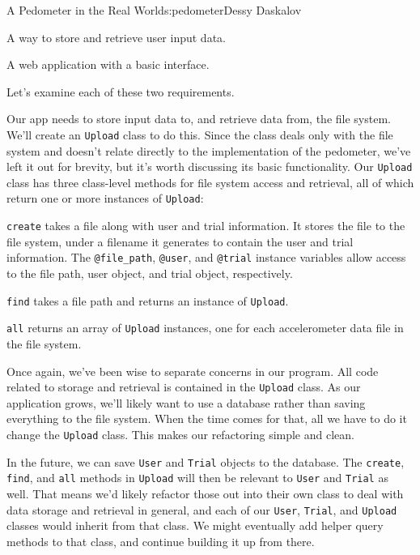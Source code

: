 \begin{aosachapter}{A Pedometer in the Real World}{s:pedometer}{Dessy Daskalov}
\begin{aosaenumerate}
\def\labelenumi{\arabic{enumi}.}

\item
  A way to store and retrieve user input data.
\item
  A web application with a basic interface.
\end{aosaenumerate}

Let's examine each of these two requirements.

\label{storing-and-retrieving-data}

Our app needs to store input data to, and retrieve data from, the file
system. We'll create an \texttt{Upload} class to do this. Since the
class deals only with the file system and doesn't relate directly to the
implementation of the pedometer, we've left it out for brevity, but it's
worth discussing its basic functionality. Our \texttt{Upload} class has
three class-level methods for file system access and retrieval, all of
which return one or more instances of \texttt{Upload}:

\begin{aosaitemize}

\item
  \texttt{create} takes a file along with user and trial information. It
  stores the file to the file system, under a filename it generates to
  contain the user and trial information. The \texttt{@file\_path},
  \texttt{@user}, and \texttt{@trial} instance variables allow access to
  the file path, user object, and trial object, respectively.
\item
  \texttt{find} takes a file path and returns an instance of
  \texttt{Upload}.
\item
  \texttt{all} returns an array of \texttt{Upload} instances, one for
  each accelerometer data file in the file system.
\end{aosaitemize}

\label{separation-of-concerns-in-upload}

Once again, we've been wise to separate concerns in our program. All
code related to storage and retrieval is contained in the
\texttt{Upload} class. As our application grows, we'll likely want to
use a database rather than saving everything to the file system. When
the time comes for that, all we have to do it change the \texttt{Upload}
class. This makes our refactoring simple and clean.

In the future, we can save \texttt{User} and \texttt{Trial} objects to
the database. The \texttt{create}, \texttt{find}, and \texttt{all}
methods in \texttt{Upload} will then be relevant to \texttt{User} and
\texttt{Trial} as well. That means we'd likely refactor those out into
their own class to deal with data storage and retrieval in general, and
each of our \texttt{User}, \texttt{Trial}, and \texttt{Upload} classes
would inherit from that class. We might eventually add helper query
methods to that class, and continue building it up from there.


\end{aosachapter}
